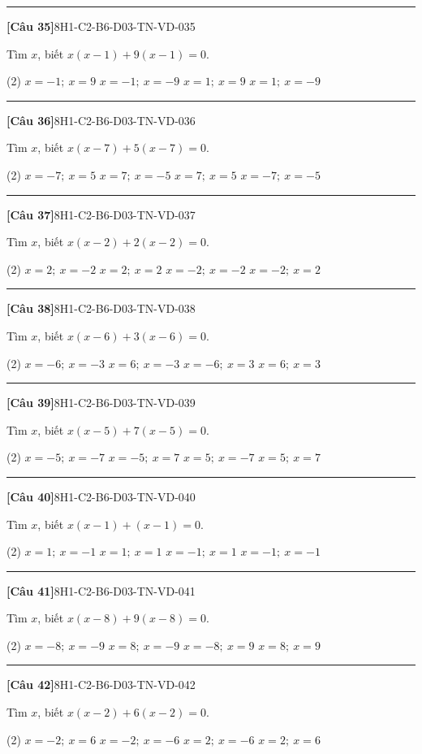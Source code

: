 \documentclass[12pt,a4paper]{article}
\newif\ifloigiai
\newenvironment{cauhoi}[2]{%
  \par\medskip\noindent\rule{\textwidth}{0.4pt}\par\nopagebreak
  \noindent\textbf{[#1]}\hfill{\scriptsize\ttfamily #2}\par\nopagebreak\smallskip}{\par}
\newcommand{\dapan}[1]{\ifloigiai\par\smallskip\noindent\textit{Đáp án:} \textbf{#1}\par\fi}
\begin{document}
\begin{cauhoi}{Câu 35}{8H1-C2-B6-D03-TN-VD-035}
Tìm $x$, biết $x(x-1)+9(x-1)=0$.
\begin{tasks}(2)
\task $x=-1;\ x=9$
\task $x=-1;\ x=-9$
\task $x=1;\ x=9$
\task $x=1;\ x=-9$
\end{tasks}
\dapan{D}
\end{cauhoi}
\begin{cauhoi}{Câu 36}{8H1-C2-B6-D03-TN-VD-036}
Tìm $x$, biết $x(x-7)+5(x-7)=0$.
\begin{tasks}(2)
\task $x=-7;\ x=5$
\task $x=7;\ x=-5$
\task $x=7;\ x=5$
\task $x=-7;\ x=-5$
\end{tasks}
\dapan{B}
\end{cauhoi}
\begin{cauhoi}{Câu 37}{8H1-C2-B6-D03-TN-VD-037}
Tìm $x$, biết $x(x-2)+2(x-2)=0$.
\begin{tasks}(2)
\task $x=2;\ x=-2$
\task $x=2;\ x=2$
\task $x=-2;\ x=-2$
\task $x=-2;\ x=2$
\end{tasks}
\dapan{A}
\end{cauhoi}
\begin{cauhoi}{Câu 38}{8H1-C2-B6-D03-TN-VD-038}
Tìm $x$, biết $x(x-6)+3(x-6)=0$.
\begin{tasks}(2)
\task $x=-6;\ x=-3$
\task $x=6;\ x=-3$
\task $x=-6;\ x=3$
\task $x=6;\ x=3$
\end{tasks}
\dapan{B}
\end{cauhoi}
\begin{cauhoi}{Câu 39}{8H1-C2-B6-D03-TN-VD-039}
Tìm $x$, biết $x(x-5)+7(x-5)=0$.
\begin{tasks}(2)
\task $x=-5;\ x=-7$
\task $x=-5;\ x=7$
\task $x=5;\ x=-7$
\task $x=5;\ x=7$
\end{tasks}
\dapan{C}
\end{cauhoi}
\begin{cauhoi}{Câu 40}{8H1-C2-B6-D03-TN-VD-040}
Tìm $x$, biết $x(x-1)+(x-1)=0$.
\begin{tasks}(2)
\task $x=1;\ x=-1$
\task $x=1;\ x=1$
\task $x=-1;\ x=1$
\task $x=-1;\ x=-1$
\end{tasks}
\dapan{A}
\end{cauhoi}
\begin{cauhoi}{Câu 41}{8H1-C2-B6-D03-TN-VD-041}
Tìm $x$, biết $x(x-8)+9(x-8)=0$.
\begin{tasks}(2)
\task $x=-8;\ x=-9$
\task $x=8;\ x=-9$
\task $x=-8;\ x=9$
\task $x=8;\ x=9$
\end{tasks}
\dapan{B}
\end{cauhoi}
\begin{cauhoi}{Câu 42}{8H1-C2-B6-D03-TN-VD-042}
Tìm $x$, biết $x(x-2)+6(x-2)=0$.
\begin{tasks}(2)
\task $x=-2;\ x=6$
\task $x=-2;\ x=-6$
\task $x=2;\ x=-6$
\task $x=2;\ x=6$
\end{tasks}
\dapan{C}
\end{cauhoi}
\end{document}
